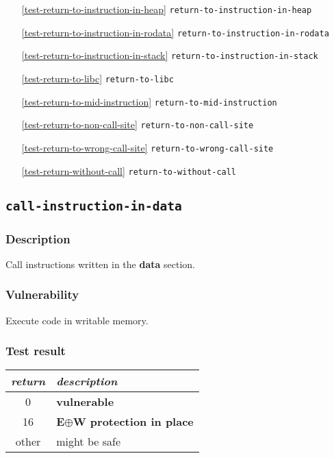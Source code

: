 \documentclass[a4paper]{book}
\begin{document}
\begin{itemize}[noitemsep]
\begin{itemize}[noitemsep, nolistsep, leftmargin=1em]
\begin{itemize}[noitemsep, nolistsep, leftmargin=1em]
    \item[\ref{test-return-to-instruction-in-heap}]   \texttt{return-to-instruction-in-heap}
    \item[\ref{test-return-to-instruction-in-rodata}] \texttt{return-to-instruction-in-rodata}
    \item[\ref{test-return-to-instruction-in-stack}]  \texttt{return-to-instruction-in-stack}
    \item[\ref{test-return-to-libc}]                  \texttt{return-to-libc}
    \item[\ref{test-return-to-mid-instruction}]       \texttt{return-to-mid-instruction}
    \item[\ref{test-return-to-non-call-site}]         \texttt{return-to-non-call-site}
    \item[\ref{test-return-to-wrong-call-site}]       \texttt{return-to-wrong-call-site}
    \item[\ref{test-return-without-call}]             \texttt{return-to-without-call}
    \end{itemize}
  \end{itemize}
\end{itemize}

\newpage
\subsection{\texttt{call-instruction-in-data}}\label{test-call-instruction-in-data}

\subsubsection{Description}
Call instructions written in the \textbf{data} section.

\subsubsection{Vulnerability}
Execute code in writable memory.

\subsubsection{Test result}
\begin{tabular}{cl}
  \toprule
  \emph{return}  & \emph{description} \\
  \midrule
  0              & \textbf{vulnerable} \\
  16             & \textbf{E$\oplus$W protection in place} \\
  other          & might be safe \\
  \bottomrule
\end{tabular}
  
\end{document}
